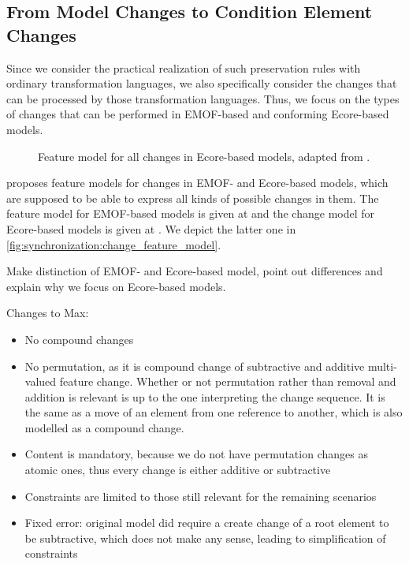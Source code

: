 \subsection{From Model Changes to Condition Element Changes}

Since we consider the practical realization of such preservation rules with ordinary transformation languages, we also specifically consider the changes that can be processed by those transformation languages.
Thus, we focus on the types of changes that can be performed in EMOF-based and conforming Ecore-based models.

\begin{figure}
    \centering
    
    \caption{Feature model for all changes in Ecore-based models, adapted from \cite[Fig. 5.3]{kramer2017a}.}
    \label{fig:synchronization:change_feature_model}
\end{figure}

\textcite{kramer2017a} proposes feature models for changes in EMOF- and Ecore-based models, which are supposed to be able to express all kinds of possible changes in them.
The feature model for EMOF-based models is given at \cite[Fig. 5.2]{kramer2017a} and the change model for Ecore-based models is given at \cite[Fig. 5.3]{kramer2017a}.
We depict the latter one in \autoref{fig:synchronization:change_feature_model}.

Make distinction of EMOF- and Ecore-based model, point out differences and explain why we focus on Ecore-based models.


Changes to Max:
\begin{itemize}
    \item No compound changes
    \item No permutation, as it is compound change of subtractive and additive multi-valued feature change. Whether or not permutation rather than removal and addition is relevant is up to the one interpreting the change sequence. It is the same as a move of an element from one reference to another, which is also modelled as a compound change.
    \item Content is mandatory, because we do not have permutation changes as atomic ones, thus every change is either additive or subtractive
    \item Constraints are limited to those still relevant for the remaining scenarios
    \item Fixed error: original model did require a create change of a root element to be subtractive, which does not make any sense, leading to simplification of constraints
\end{itemize}

